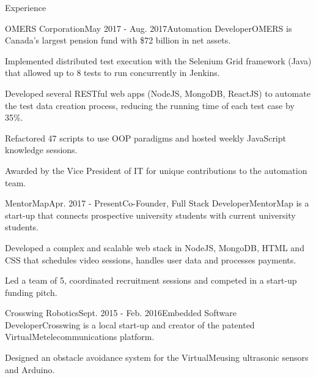 \documentclass{resume} %
\begin{document}
\begin{rSection}{Experience}

\begin{expSec}{OMERS Corporation}{May 2017 - Aug. 2017}{Automation Developer}{OMERS is Canada's largest pension fund with \$72 billion in net assets.}
\item Implemented distributed test execution with the Selenium Grid framework (Java) that allowed up to 8 tests to run concurrently in Jenkins.
\item Developed several RESTful web apps (NodeJS, MongoDB, ReactJS) to automate the test data creation process, reducing the running time of each test case by 35\%.
\item Refactored 47 scripts to use OOP paradigms and hosted weekly JavaScript knowledge sessions.
\item Awarded by the Vice President of IT for unique contributions to the automation team.
\end{expSec}

\begin{expSec}{MentorMap}{Apr. 2017 - Present}{Co-Founder, Full Stack Developer}{MentorMap is a start-up that connects prospective university students with current university students.}
\item Developed a complex and scalable web stack in NodeJS, MongoDB, HTML and CSS that schedules video sessions, handles user data and processes payments.
\item Led a team of 5, coordinated recruitment sessions and competed in a start-up funding pitch.
\end{expSec}

\begin{expSec}{Crosswing Robotics}{Sept. 2015 - Feb. 2016}{Embedded Software Developer}{Crosswing is a local start-up and creator of the patented VirtualMe\texttrademark\space telecommunications platform.}
\item Designed an obstacle avoidance system for the VirtualMe\texttrademark\space using ultrasonic sensors and Arduino.
\end{expSec}


\end{rSection}


\end{document}
